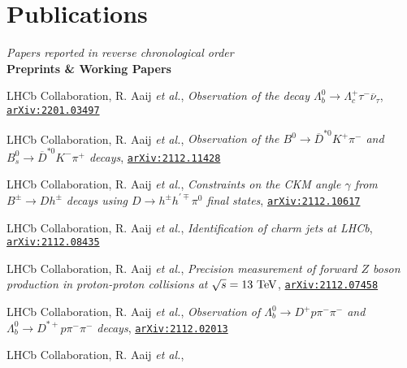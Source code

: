 \newcommand{\journal}[1]
  {\textbf{\large #1}\\\vspace{-5mm}}

\newcommand{\arxiv}[1]
  {\href{https://arxiv.org/abs/#1}{\texttt{arXiv:#1}}}


\section*{Publications}
\begin{cvcontent}
  \emph{Papers reported in reverse chronological order}\\[2.5mm]
  \journal{Preprints \& Working Papers}
  \begin{enumerate}[label={[\arabic*]}, leftmargin=1.5cm]
    \item LHCb Collaboration, R. Aaij \emph{et al.}, 
    \emph{Observation of the decay $\Lambda_b^0 \rightarrow \Lambda_c^+\tau^-\overline{\nu}_{\tau}$},
    \arxiv{2201.03497}
    \item LHCb Collaboration, R. Aaij \emph{et al.}, 
    \emph{Observation of the $B^0\rightarrow\overline{D}^{*0}K^{+}\pi^{-}$ and $B_s^0\rightarrow\overline{D}^{*0}K^{-}\pi^{+}$ decays},
    \arxiv{2112.11428}
    \item LHCb Collaboration, R. Aaij \emph{et al.}, 
    \emph{Constraints on the CKM angle $\gamma$ from $B^\pm \rightarrow Dh^\pm$ decays using $D \rightarrow h^\pm h^{\prime\mp}\pi^0$ final states},
    \arxiv{2112.10617}
    \item LHCb Collaboration, R. Aaij \emph{et al.}, 
    \emph{Identification of charm jets at LHCb},
    \arxiv{2112.08435}
    \item LHCb Collaboration, R. Aaij \emph{et al.}, 
    \emph{Precision measurement of forward $Z$ boson production in proton-proton collisions at $\sqrt{s} = 13~\rm{TeV}$},
    \arxiv{2112.07458}
    \item LHCb Collaboration, R. Aaij \emph{et al.}, 
    \emph{Observation of $\Lambda_b^0\rightarrow D^+ p \pi^-\pi^-$ and $\Lambda_b^0\rightarrow D^{*+} p \pi^-\pi^-$ decays},
    \arxiv{2112.02013}
    \item LHCb Collaboration, R. Aaij \emph{et al.}, 

\end{enumerate}
\end{cvcontent}
